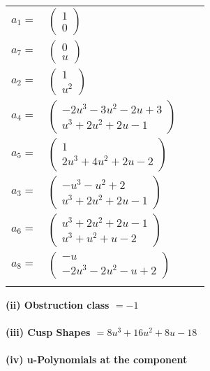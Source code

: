 \documentclass[1p]{elsarticle_modified}
\theoremstyle{definition}
\begin{document}
\begin{tabular}{m{7pt} m{180pt} m{7pt} m{180pt} }
\flushright $a_{1}=$&$\begin{pmatrix}1\\0\end{pmatrix}$ \\
\flushright $a_{7}=$&$\begin{pmatrix}0\\u\end{pmatrix}$ \\
\flushright $a_{2}=$&$\begin{pmatrix}1\\u^2\end{pmatrix}$ \\
\flushright $a_{4}=$&$\begin{pmatrix}-2 u^3-3 u^2-2 u+3\\u^3+2 u^2+2 u-1\end{pmatrix}$ \\
\flushright $a_{5}=$&$\begin{pmatrix}1\\2 u^3+4 u^2+2 u-2\end{pmatrix}$ \\
\flushright $a_{3}=$&$\begin{pmatrix}- u^3- u^2+2\\u^3+2 u^2+2 u-1\end{pmatrix}$ \\
\flushright $a_{6}=$&$\begin{pmatrix}u^3+2 u^2+2 u-1\\u^3+u^2+u-2\end{pmatrix}$ \\
\flushright $a_{8}=$&$\begin{pmatrix}- u\\-2 u^3-2 u^2- u+2\end{pmatrix}$\\&\end{tabular}
\flushleft \textbf{(ii) Obstruction class $= -1$}\\~\\
\flushleft \textbf{(iii) Cusp Shapes $= 8 u^3+16 u^2+8 u-18$}\\~\\
\newpage\renewcommand{\arraystretch}{1}
\flushleft \textbf{(iv) u-Polynomials at the component}\newline \\
\end{document}
